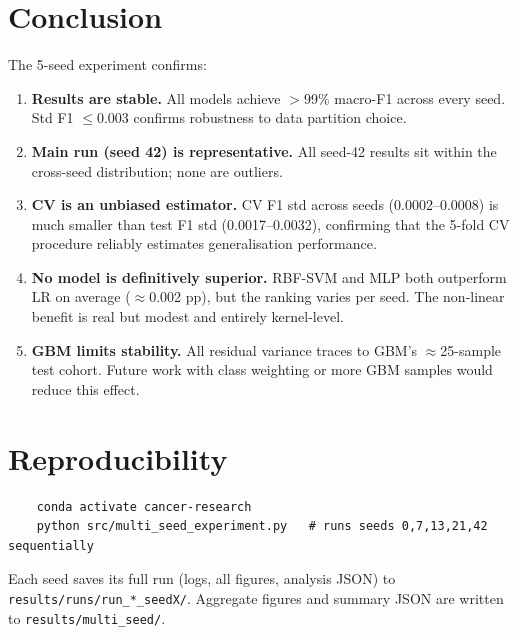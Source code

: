 \documentclass[11pt,letterpaper]{article}
\begin{document}
\section{Conclusion}

The 5-seed experiment confirms:

\begin{enumerate}[leftmargin=2em,itemsep=2pt]
  \item \textbf{Results are stable.}  All models achieve $>$99\% macro-F1
        across every seed.  Std F1 $\leq$0.003 confirms robustness to
        data partition choice.
  \item \textbf{Main run (seed 42) is representative.}  All seed-42 results
        sit within the cross-seed distribution; none are outliers.
  \item \textbf{CV is an unbiased estimator.}  CV F1 std across seeds
        (0.0002--0.0008) is much smaller than test F1 std (0.0017--0.0032),
        confirming that the 5-fold CV procedure reliably estimates
        generalisation performance.
  \item \textbf{No model is definitively superior.}  RBF-SVM and MLP both
        outperform LR on average ($\approx$0.002 pp), but the ranking
        varies per seed.  The non-linear benefit is real but modest and
        entirely kernel-level.
  \item \textbf{GBM limits stability.}  All residual variance traces to
        GBM's $\approx$25-sample test cohort.  Future work with class
        weighting or more GBM samples would reduce this effect.
\end{enumerate}

\section*{Reproducibility}

\begin{verbatim}
    conda activate cancer-research
    python src/multi_seed_experiment.py   # runs seeds 0,7,13,21,42 sequentially
\end{verbatim}

Each seed saves its full run (logs, all figures, analysis JSON) to
\texttt{results/runs/run\_*\_seedX/}.  Aggregate figures and summary JSON
are written to \texttt{results/multi\_seed/}.
\end{document}

